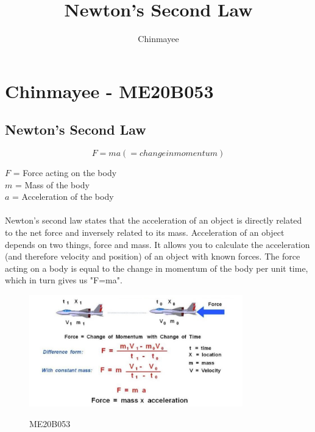 \documentclass{article}
\title{Newton's Second Law}
\author{Chinmayee}
\begin{document}
\section{Chinmayee - ME20B053}
\subsection{Newton's Second Law} \cite{Newton's Second Law}

\begin{equation}
F=ma (= change in momentum)
\end{equation}

\begin{description}
$F$ = Force acting on the body \\
$m$ = Mass of the body \\
$a$ = Acceleration of the body \\
\end{description}

\paragraph{}
Newton's second law states that the acceleration of an object is directly related to the net force and inversely related to its mass. Acceleration of an object depends on two things, force and mass. It allows you to calculate the acceleration (and therefore velocity and position) of an object with known forces. The force acting on a body is equal to the change in momentum of the body per unit time, which in turn gives us "F=ma".  

\begin{figure}
\includegraphics[width=350px]{ME20B053.png}
\caption{ME20B053} \cite{image}
\label{fig : Newton's Second Law}
\end{figure}



\end{document}
